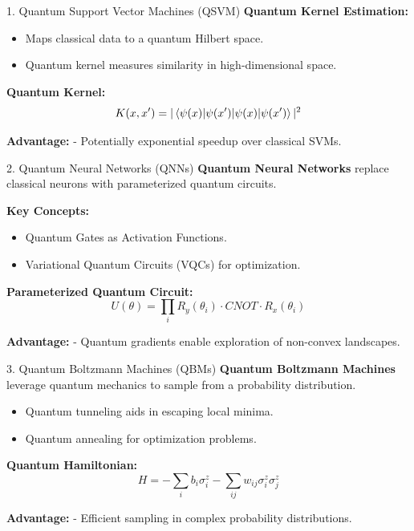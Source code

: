 \documentclass{beamer}
\begin{document}






\begin{frame}{1. Quantum Support Vector Machines (QSVM)}
\textbf{Quantum Kernel Estimation:}
\begin{itemize}
    \item Maps classical data to a quantum Hilbert space.
    \item Quantum kernel measures similarity in high-dimensional space.
\end{itemize}

\pause
\textbf{Quantum Kernel:}
\[
K(x, x') = |\braket{\psi(x) | \psi(x')}|^2
\]

\textbf{Advantage:}
- Potentially exponential speedup over classical SVMs.
\end{frame}

\begin{frame}{2. Quantum Neural Networks (QNNs)}
\textbf{Quantum Neural Networks} replace classical neurons with parameterized quantum circuits.

\textbf{Key Concepts:}
\begin{itemize}
    \item Quantum Gates as Activation Functions.
    \item Variational Quantum Circuits (VQCs) for optimization.
\end{itemize}

\pause
\textbf{Parameterized Quantum Circuit:}
\[
U(\theta) = \prod_i R_y(\theta_i) \cdot CNOT \cdot R_x(\theta_i)
\]

\textbf{Advantage:}
- Quantum gradients enable exploration of non-convex landscapes.
\end{frame}

\begin{frame}{3. Quantum Boltzmann Machines (QBMs)}
\textbf{Quantum Boltzmann Machines} leverage quantum mechanics to sample from a probability distribution.

\begin{itemize}
    \item Quantum tunneling aids in escaping local minima.
    \item Quantum annealing for optimization problems.
\end{itemize}

\pause
\textbf{Quantum Hamiltonian:}
\[
H = -\sum_i b_i \sigma_i^z - \sum_{ij} w_{ij} \sigma_i^z \sigma_j^z
\]

\textbf{Advantage:}
- Efficient sampling in complex probability distributions.
\end{frame}
\end{document}
